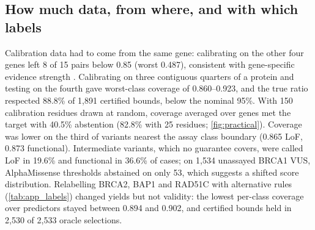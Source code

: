 \subsection{How much data, from where, and with which labels}\label{sec:transfer}
Calibration data had to come from the same gene: calibrating on the other four genes left 8 of 15 pairs below 0.85
(worst 0.487), consistent with gene-specific evidence strength \cite{Tejura2024,Chen2026}. Calibrating on three
contiguous quarters of a protein and testing on the fourth gave worst-class coverage of 0.860--0.923, and the true ratio respected 88.8\% of 1,891 certified bounds, below the nominal 95\%. With 150 calibration residues drawn at random, coverage
averaged over genes met the target with 40.5\% abstention (82.8\% with 25 residues; \cref{fig:practical}). Coverage was lower on the third of
variants nearest the assay class boundary (0.865 LoF, 0.873 functional). Intermediate variants, which no guarantee
covers, were called LoF in 19.6\% and functional in 36.6\% of cases; on 1,534 unassayed BRCA1 VUS, AlphaMissense thresholds abstained on only 53, which suggests a shifted score distribution. Relabelling BRCA2,
BAP1 and RAD51C with alternative rules (\cref{tab:app_labels}) changed yields but not validity: the lowest per-class coverage over predictors stayed between 0.894 and 0.902, and certified bounds held in 2,530 of 2,533 oracle selections.

